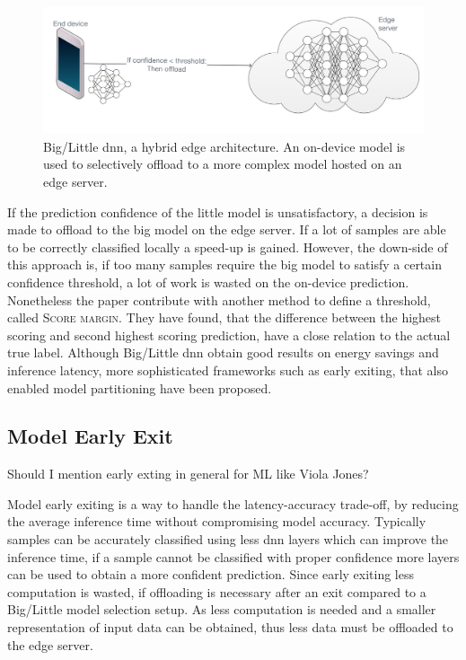\begin{figure}
	\centering
	\includegraphics[width=\linewidth]{figures/models/big_little_dnn}
	\caption[Big/Little \gls{dnn} architecture]{Big/Little \gls{dnn}, a hybrid edge architecture. An on-device model is used to selectively offload to a more complex model hosted on an edge server.}
	\label{fig:big/little-dnn}
\end{figure}

If the prediction confidence of the little model is unsatisfactory, a decision is made to offload to the big model on the edge server. If a lot of samples are able to be correctly classified locally a speed-up is gained. However, the down-side of this approach is, if too many samples require the big model to satisfy a certain confidence threshold, a lot of work is wasted on the on-device prediction. Nonetheless the paper \cite{park_big/little_2015} contribute with another method to define a threshold, called \textsc{Score margin}. They have found, that the difference between the highest scoring and second highest scoring prediction, have a close relation to the actual true label. Although Big/Little \gls{dnn} obtain good results on energy savings and inference latency, more sophisticated frameworks such as early exiting, that also enabled model partitioning have been proposed.

\subsection{Model Early Exit}

Should I mention early exting in general for ML like Viola Jones? \cite{viola_rapid_2001}

Model early exiting is a way to handle the latency-accuracy trade-off, by reducing the average inference time without compromising model accuracy. Typically samples can be accurately classified using less \gls{dnn} layers which can improve the inference time, if a sample cannot be classified with proper confidence more layers can be used to obtain a more confident prediction. Since early exiting less computation is wasted, if offloading is necessary after an exit compared to a Big/Little model selection setup. As less computation is needed and a smaller representation of input data can be obtained, thus less data must be offloaded to the edge server.

